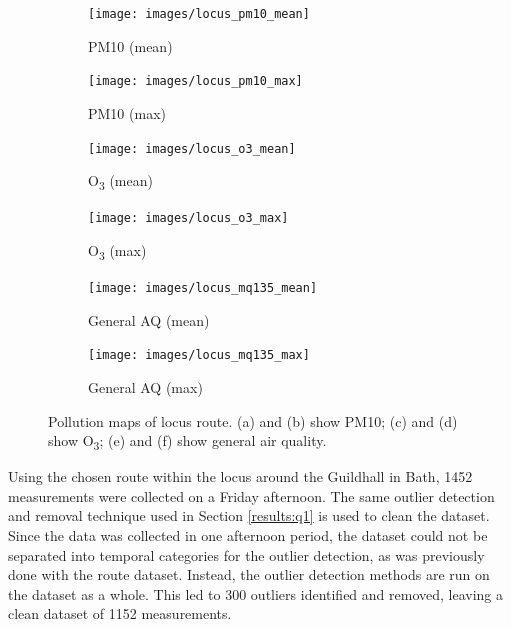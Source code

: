 \documentclass[11pt,twosided,a4paper]{report}
\begin{document}
\begin{figure}[!htb]
    \centering
    \begin{minipage}{1\linewidth}
            \begin{subfigure}[t]{.5\linewidth}
                \texttt{[image: images/locus\_pm10\_mean]}
                \caption{PM10 (mean)}
                \label{fig:locus_pm10_mean}
            \end{subfigure}
            \begin{subfigure}[t]{.5\linewidth}
            	\texttt{[image: images/locus\_pm10\_max]}
            	\caption{PM10 (max)}
            	\label{fig:locus_pm10_max}
	   \end{subfigure}
        \end{minipage}
    \begin{minipage}{1\linewidth}
            \begin{subfigure}[t]{.5\linewidth}
                \texttt{[image: images/locus\_o3\_mean]}
                \caption{O\textsubscript{3} (mean)}
                \label{fig:locus_o3_mean}
            \end{subfigure}
            \begin{subfigure}[t]{.5\linewidth}
            	\texttt{[image: images/locus\_o3\_max]}
            	\caption{O\textsubscript{3} (max)}
            	\label{fig:locus_o3_max}
	   \end{subfigure}
        \end{minipage}
    \begin{minipage}{1\linewidth}
            \begin{subfigure}[t]{.5\linewidth}
                \texttt{[image: images/locus\_mq135\_mean]}
                \caption{General AQ (mean)}
                \label{fig:locus_mq135_mean}
            \end{subfigure}
            \begin{subfigure}[t]{.5\linewidth}
            	\texttt{[image: images/locus\_mq135\_max]}
            	\caption{General AQ (max)}
            	\label{fig:locus_mq135_max}
	   \end{subfigure}
        \end{minipage}
    \caption[Pollution maps of locus route.]{Pollution maps of locus route. (a) and (b) show PM10; (c) and (d) show O\textsubscript{3}; (e) and (f) show general air quality.}
    \label{fig:locus_maps}
\end{figure}

Using the chosen route within the locus around the Guildhall in Bath, \num{1452} measurements were collected on a Friday afternoon. The same outlier detection and removal technique used in Section \ref{results:q1} is used to clean the dataset. Since the data was collected in one afternoon period, the dataset could not be separated into temporal categories for the outlier detection, as was previously done with the route dataset. Instead, the outlier detection methods are run on the dataset as a whole. This led to 300 outliers identified and removed, leaving a clean dataset of 1152 measurements.
\end{document}
